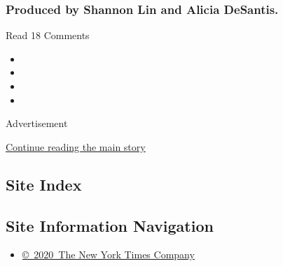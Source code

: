 \hypertarget{produced-by-shannon-lin-and-alicia-desantis}{%
\subsubsection{Produced by Shannon Lin and Alicia
DeSantis.}\label{produced-by-shannon-lin-and-alicia-desantis}}

Read 18 Comments

\begin{itemize}
\item
\item
\item
\item
\end{itemize}

Advertisement

\protect\hyperlink{after-bottom}{Continue reading the main story}

\hypertarget{site-index}{%
\subsection{Site Index}\label{site-index}}

\hypertarget{site-information-navigation}{%
\subsection{Site Information
Navigation}\label{site-information-navigation}}

\begin{itemize}
\tightlist
\item
  \href{https://help.nytimes3xbfgragh.onion/hc/en-us/articles/115014792127-Copyright-notice}{©~2020~The
  New York Times Company}
\end{itemize}


